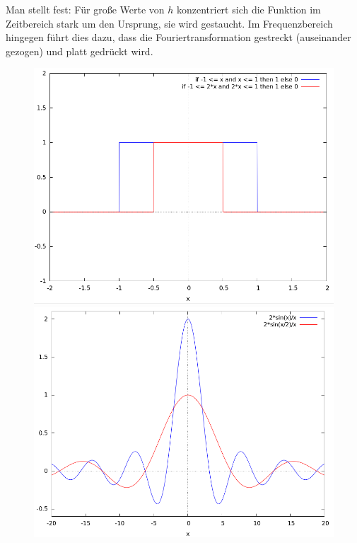 \begin{remark}
\begin{enumerate}
    Man stellt fest: Für große Werte von $ h $ konzentriert sich die Funktion im Zeitbereich stark 
    um den Ursprung, sie wird gestaucht. Im Frequenzbereich hingegen führt dies dazu, dass die 
    Fouriertransformation gestreckt (auseinander gezogen) und platt gedrückt wird.
    \begin{figure}[ht]
      \centering
      \begin{minipage}{0.49\linewidth}
        \centering
        \includegraphics[width=\linewidth]{Bilder/FT_Skalierung_Zeit}
      \end{minipage}
      \begin{minipage}{0.49\linewidth}
        \centering
        \includegraphics[width=\linewidth]{Bilder/FT_Skalierung_Freq}

\end{minipage}
\end{figure}
\end{enumerate}
\end{remark}
